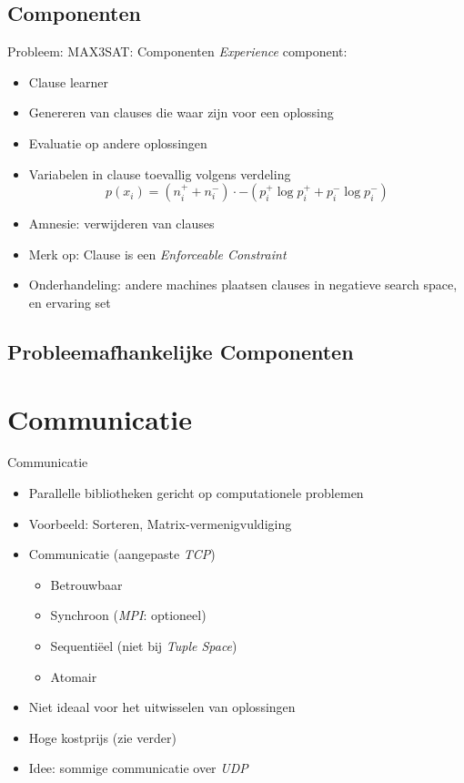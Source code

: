 \documentclass{beamer}
\begin{document}
\subsection{Componenten}
\begin{frame}{Probleem: MAX3SAT: Componenten}
\emph{Experience} component:
\begin{itemize}
 \item Clause learner
 \item Genereren van clauses die waar zijn voor een oplossing
 \item Evaluatie op andere oplossingen
 \item Variabelen in clause toevallig volgens verdeling
 \begin{equation}
  p(x_i)=(n_i^++n_i^-)\cdot -(p_i^+\log p_i^++p_i^-\log p_i^-)
 \end{equation}
 \item Amnesie: verwijderen van clauses
 \item Merk op: Clause is een \emph{Enforceable Constraint}
 \item Onderhandeling: andere machines plaatsen clauses in negatieve search space, en ervaring set
\end{itemize}
\end{frame}
\subsection{Probleemafhankelijke Componenten}
\section{Communicatie}
\begin{frame}{Communicatie}
\begin{itemize}
 \item Parallelle bibliotheken gericht op computationele problemen
 \item Voorbeeld: Sorteren, Matrix-vermenigvuldiging
 \item Communicatie (aangepaste \emph{TCP})
 \begin{itemize}
  \item Betrouwbaar
  \item Synchroon (\emph{MPI}: optioneel)
  \item Sequenti\"eel (niet bij \emph{Tuple Space})
  \item Atomair
 \end{itemize}
 \item Niet ideaal voor het uitwisselen van oplossingen
 \item Hoge kostprijs (zie verder)
 \item Idee: sommige communicatie over \emph{UDP}
\end{itemize}
\end{frame}
\end{document}
